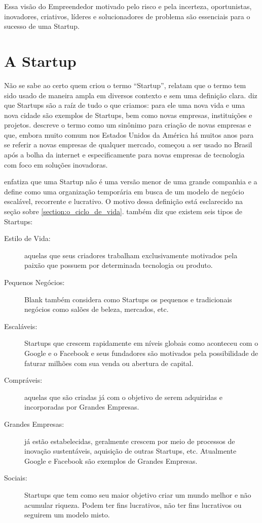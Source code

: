 Essa visão do Empreendedor motivado pelo risco e pela incerteza, oportunistas, inovadores, criativos, líderes e solucionadores de problema são essenciais para o sucesso de uma Startup.

\section{A Startup}
\label{section:as_startups}

Não se sabe ao certo quem criou o termo ``Startup'',  relatam que o termo tem sido usado de maneira ampla em diversos contexto e sem uma definição clara.  diz que Startups são a raíz de tudo o que criamos: para ele uma nova vida e uma nova cidade são exemplos de Startups, bem como novas empresas, instituições e projetos.
 descreve o termo como um sinônimo para criação de novas empresas e que, embora muito comum nos Estados Unidos da América há muitos anos para se referir a novas empresas de qualquer mercado, começou a ser usado no Brasil após a bolha da internet e especificamente para novas empresas de tecnologia com foco em soluções inovadoras.

 enfatiza que uma Startup não é uma versão menor de uma grande companhia e a define como uma organização temporária em busca de um modelo de negócio escalável, recorrente e lucrativo. O motivo dessa definição está esclarecido na seção sobre \ref{section:o_ciclo_de_vida}.  também  diz que existem seis tipos de Startups: 

\begin{description}
	\item [Estilo de Vida:] aquelas que seus criadores trabalham exclusivamente motivados pela paixão que possuem por determinada tecnologia ou produto.

	\item [Pequenos Negócios:] Blank também considera como Startups os pequenos e tradicionais negócios como salões de beleza, mercados, etc.

	\item [Escaláveis:] Startups que crescem rapidamente em níveis globais como aconteceu com o Google e o Facebook e seus fundadores são motivados pela possibilidade de faturar milhões com sua venda ou abertura de capital.

	\item [Compráveis:] aquelas que são criadas já com o objetivo de serem adquiridas e incorporadas por Grandes Empresas.

	\item [Grandes Empresas:] já estão estabelecidas, geralmente crescem por meio de processos de inovação sustentáveis, aquisição de outras Startups, etc. Atualmente Google e Facebook são exemplos de Grandes Empresas.

	\item [Sociais:] Startups que tem como seu maior objetivo criar um mundo melhor e não acumular riqueza. Podem ter fins lucrativos, não ter fins lucrativos ou seguirem um modelo misto.
\end{description}

